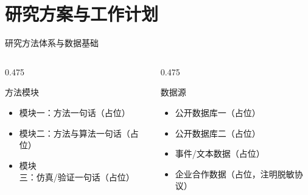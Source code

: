 \documentclass[aspectratio=169,11pt]{beamer}
\begin{document}
\section{研究方案与工作计划}

\begin{frame}{研究方法体系与数据基础}
  \footnotesize
  \begin{columns}[T]
    \begin{column}{0.475\textwidth}
      \begin{card}{方法模块}
        \begin{itemize}
          \item \textcolor{primary}{模块一}：方法一句话（占位）
          \item \textcolor{primary}{模块二}：方法与算法一句话（占位）
          \item \textcolor{primary}{模块三}：仿真/验证一句话（占位）
        \end{itemize}
      \end{card}
    \end{column}
    \begin{column}{0.475\textwidth}
      \begin{card}{数据源}
        \begin{itemize}
          \item 公开数据库一（占位）
          \item 公开数据库二（占位）
          \item 事件/文本数据（占位）
          \item 企业合作数据（占位，注明脱敏协议）
        \end{itemize}
      \end{card}
    \end{column}
  \end{columns}
\end{frame}
\end{document}

